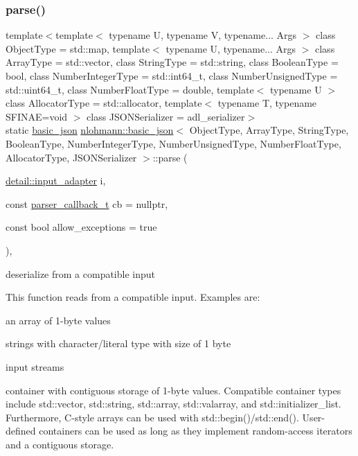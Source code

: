 \subsubsection{\texorpdfstring{parse()}{parse()}\hspace{0.1cm}{\footnotesize\ttfamily [1/3]}}
{\footnotesize\ttfamily template$<$template$<$ typename U, typename V, typename... Args $>$ class Object\+Type = std\+::map, template$<$ typename U, typename... Args $>$ class Array\+Type = std\+::vector, class String\+Type  = std\+::string, class Boolean\+Type  = bool, class Number\+Integer\+Type  = std\+::int64\+\_\+t, class Number\+Unsigned\+Type  = std\+::uint64\+\_\+t, class Number\+Float\+Type  = double, template$<$ typename U $>$ class Allocator\+Type = std\+::allocator, template$<$ typename T, typename S\+F\+I\+N\+A\+E=void $>$ class J\+S\+O\+N\+Serializer = adl\+\_\+serializer$>$ \\
static \mbox{\hyperlink{classnlohmann_1_1basic__json}{basic\+\_\+json}} \mbox{\hyperlink{classnlohmann_1_1basic__json}{nlohmann\+::basic\+\_\+json}}$<$ Object\+Type, Array\+Type, String\+Type, Boolean\+Type, Number\+Integer\+Type, Number\+Unsigned\+Type, Number\+Float\+Type, Allocator\+Type, J\+S\+O\+N\+Serializer $>$\+::parse (\begin{DoxyParamCaption}\item[{\mbox{\hyperlink{classnlohmann_1_1detail_1_1input__adapter}{detail\+::input\+\_\+adapter}}}]{i,  }\item[{const \mbox{\hyperlink{classnlohmann_1_1basic__json_ab4f78c5f9fd25172eeec84482e03f5b7}{parser\+\_\+callback\+\_\+t}}}]{cb = {\ttfamily nullptr},  }\item[{const bool}]{allow\+\_\+exceptions = {\ttfamily true} }\end{DoxyParamCaption})\hspace{0.3cm}{\ttfamily [inline]}, {\ttfamily [static]}}



deserialize from a compatible input 

This function reads from a compatible input. Examples are\+:
\begin{DoxyItemize}
\item an array of 1-\/byte values
\item strings with character/literal type with size of 1 byte
\item input streams
\item container with contiguous storage of 1-\/byte values. Compatible container types include {\ttfamily std\+::vector}, {\ttfamily std\+::string}, {\ttfamily std\+::array}, {\ttfamily std\+::valarray}, and {\ttfamily std\+::initializer\+\_\+list}. Furthermore, C-\/style arrays can be used with {\ttfamily std\+::begin()}/{\ttfamily std\+::end()}. User-\/defined containers can be used as long as they implement random-\/access iterators and a contiguous storage.
\end{DoxyItemize}

